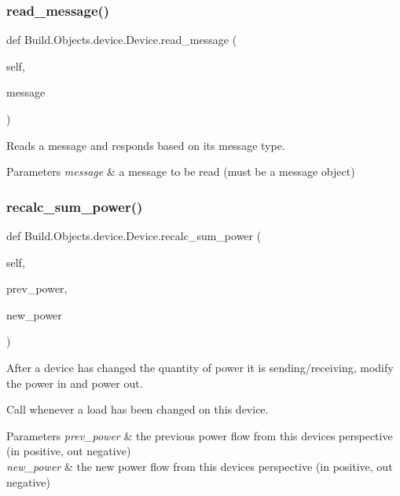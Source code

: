 \subsubsection{\texorpdfstring{read\+\_\+message()}{read\_message()}}
{\footnotesize\ttfamily def Build.\+Objects.\+device.\+Device.\+read\+\_\+message (\begin{DoxyParamCaption}\item[{}]{self,  }\item[{}]{message }\end{DoxyParamCaption})}



Reads a message and responds based on its message type. 


\begin{DoxyParams}{Parameters}
{\em message} & a message to be read (must be a message object) \\
\hline
\end{DoxyParams}
\mbox{\label{class_build_1_1_objects_1_1device_1_1_device_a576ceef658b74d05291b3dbc2b1ba1da}} 
\subsubsection{\texorpdfstring{recalc\+\_\+sum\+\_\+power()}{recalc\_sum\_power()}}
{\footnotesize\ttfamily def Build.\+Objects.\+device.\+Device.\+recalc\+\_\+sum\+\_\+power (\begin{DoxyParamCaption}\item[{}]{self,  }\item[{}]{prev\+\_\+power,  }\item[{}]{new\+\_\+power }\end{DoxyParamCaption})}



After a device has changed the quantity of power it is sending/receiving, modify the power in and power out. 

Call whenever a load has been changed on this device. 
\begin{DoxyParams}{Parameters}
{\em prev\+\_\+power} & the previous power flow from this device\textquotesingle{}s perspective (in positive, out negative) \\
\hline
{\em new\+\_\+power} & the new power flow from this device\textquotesingle{}s perspective (in positive, out negative) \\
\hline
\end{DoxyParams}
\mbox{\label{class_build_1_1_objects_1_1device_1_1_device_a015f4cfeb779c8c6338c65bab7e314ec}} 
